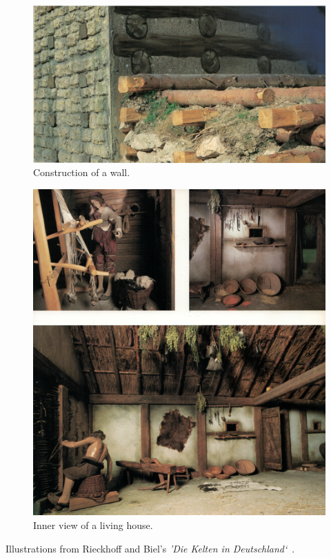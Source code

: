 \begin{figure}[ht]
	\centering
	\includegraphics[width=\linewidth]{pictures/scan_manching_4.png}
	\caption{Construction of a wall.}
\end{figure}


\begin{figure}[ht]
	\centering
	\includegraphics[width=\linewidth]{pictures/scan_manching_3.png}
	\caption{Inner view of a living house.}
\end{figure}

\clearpage
\pagebreak
Illustrations from Rieckhoff and Biel's \textit{'Die Kelten in Deutschland`}~\cite{rieckhoff-walls1}\cite{rieckhoff-walls2}\cite{rieckhoff-tower}.

